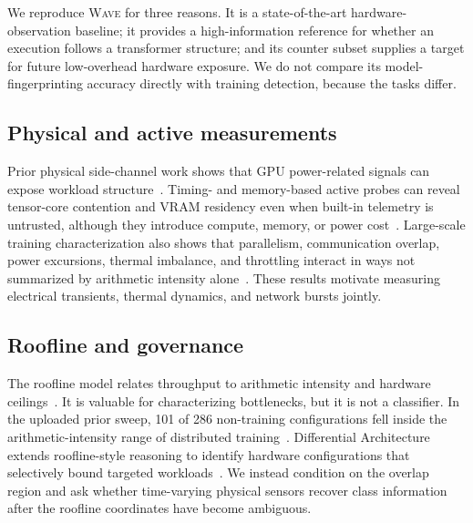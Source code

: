\documentclass[sigplan,anonymous,review,nonacm]{acmart}
\newcommand{\wave}{\textsc{Wave}}
\begin{document}
We reproduce \wave{} for three reasons. It is a state-of-the-art hardware-observation baseline; it provides a high-information reference for whether an execution follows a transformer structure; and its counter subset supplies a target for future low-overhead hardware exposure. We do not compare its model-fingerprinting accuracy directly with training detection, because the tasks differ.

\subsection{Physical and active measurements}

Prior physical side-channel work shows that GPU power-related signals can expose workload structure~\cite{maia2022magnetic,arefin2025ports}. Timing- and memory-based active probes can reveal tensor-core contention and VRAM residency even when built-in telemetry is untrusted, although they introduce compute, memory, or power cost~\cite{monfared2026timing}. Large-scale training characterization also shows that parallelism, communication overlap, power excursions, thermal imbalance, and throttling interact in ways not summarized by arithmetic intensity alone~\cite{go2025distributed}. These results motivate measuring electrical transients, thermal dynamics, and network bursts jointly.

\subsection{Roofline and governance}

The roofline model relates throughput to arithmetic intensity and hardware ceilings~\cite{williams2009roofline}. It is valuable for characterizing bottlenecks, but it is not a classifier. In the uploaded prior sweep, 101 of 286 non-training configurations fell inside the arithmetic-intensity range of distributed training~\cite{anonymous2026always}. Differential Architecture extends roofline-style reasoning to identify hardware configurations that selectively bound targeted workloads~\cite{anonymous2026differential}. We instead condition on the overlap region and ask whether time-varying physical sensors recover class information after the roofline coordinates have become ambiguous.
\end{document}
